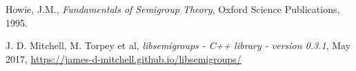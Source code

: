 \begin{thebibliography}{99}

  Howie, J.M.,
  \textit{Fundamentals of Semigroup Theory},
  Oxford Science Publications,
  1995.

  J. D. Mitchell, M. Torpey et al,
  \textit{libsemigroups - C++ library - version 0.3.1},
  May 2017,
  \url{https://james-d-mitchell.github.io/libsemigroups/}

\end{thebibliography}
